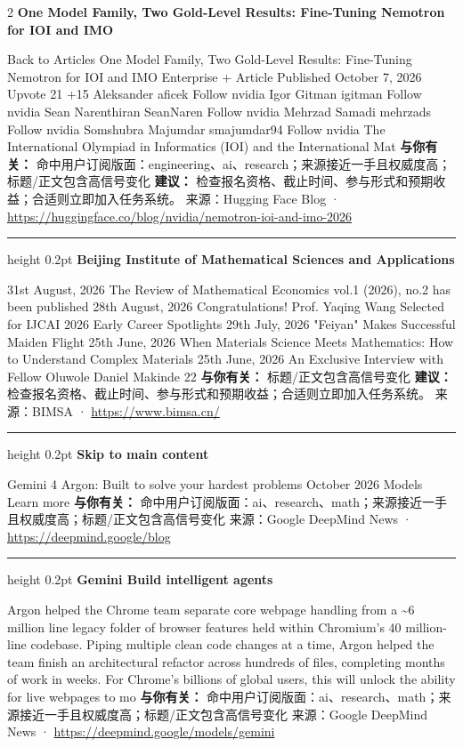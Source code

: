 \documentclass[10.5pt]{ctexart}
\begin{document}
\begin{multicols}{2}
{\large\bfseries One Model Family, Two Gold-Level Results: Fine-Tuning Nemotron for IOI and IMO}\par
Back to Articles One Model Family, Two Gold-Level Results: Fine-Tuning Nemotron for IOI and IMO Enterprise + Article Published October 7, 2026 Upvote 21 +15 Aleksander aficek Follow nvidia Igor Gitman igitman Follow nvidia Sean Narenthiran SeanNaren Follow nvidia Mehrzad Samadi mehrzads Follow nvidia Somshubra Majumdar smajumdar94 Follow nvidia The International Olympiad in Informatics (IOI) and the International Mat
\textbf{与你有关：} 命中用户订阅版面：engineering、ai、research；来源接近一手且权威度高；标题/正文包含高信号变化
\textbf{建议：} 检查报名资格、截止时间、参与形式和预期收益；合适则立即加入任务系统。
{\footnotesize\color{ormuted} 来源：Hugging Face Blog · \url{https://huggingface.co/blog/nvidia/nemotron-ioi-and-imo-2026}}
\vspace{2mm}
\hrule height 0.2pt
\vspace{2mm}
{\large\bfseries Beijing Institute of Mathematical Sciences and Applications}\par
31st August, 2026 The Review of Mathematical Economics vol.1 (2026), no.2 has been published 28th August, 2026 Congratulations! Prof. Yaqing Wang Selected for IJCAI 2026 Early Career Spotlights 29th July, 2026 "Feiyan" Makes Successful Maiden Flight 25th June, 2026 When Materials Science Meets Mathematics: How to Understand Complex Materials 25th June, 2026 An Exclusive Interview with Fellow Oluwole Daniel Makinde 22
\textbf{与你有关：} 标题/正文包含高信号变化
\textbf{建议：} 检查报名资格、截止时间、参与形式和预期收益；合适则立即加入任务系统。
{\footnotesize\color{ormuted} 来源：BIMSA · \url{https://www.bimsa.cn/}}
\vspace{2mm}
\hrule height 0.2pt
\vspace{2mm}
{\large\bfseries Skip to main content}\par
Gemini 4 Argon: Built to solve your hardest problems October 2026 Models Learn more
\textbf{与你有关：} 命中用户订阅版面：ai、research、math；来源接近一手且权威度高；标题/正文包含高信号变化
{\footnotesize\color{ormuted} 来源：Google DeepMind News · \url{https://deepmind.google/blog}}
\vspace{2mm}
\hrule height 0.2pt
\vspace{2mm}
{\large\bfseries Gemini Build intelligent agents}\par
Argon helped the Chrome team separate core webpage handling from a \textasciitilde{}6 million line legacy folder of browser features held within Chromium’s 40 million-line codebase. Piping multiple clean code changes at a time, Argon helped the team finish an architectural refactor across hundreds of files, completing months of work in weeks. For Chrome's billions of global users, this will unlock the ability for live webpages to mo
\textbf{与你有关：} 命中用户订阅版面：ai、research、math；来源接近一手且权威度高；标题/正文包含高信号变化
{\footnotesize\color{ormuted} 来源：Google DeepMind News · \url{https://deepmind.google/models/gemini}}
\end{multicols}
\end{document}
